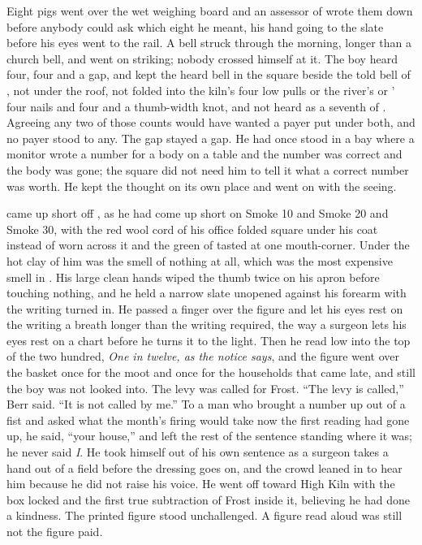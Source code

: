 Eight pigs went over the wet weighing board and an assessor of  wrote them down before anybody could ask which eight he meant, his hand going to the slate before his eyes went to the rail. A bell struck through the morning, longer than a church bell, and went on striking; nobody crossed himself at it. The boy heard four, four and a gap, and kept the heard bell in the square beside the told bell of , not under the roof, not folded into the kiln's four low pulls or the river's  or ' four nails and four and a thumb-width knot, and not heard as a seventh of . Agreeing any two of those counts would have wanted a payer put under both, and no payer stood to any. The gap stayed a gap. He had once stood in a bay where a monitor wrote a number for a body on a table and the number was correct and the body was gone; the square did not need him to tell it what a correct number was worth. He kept the thought on its own place and went on with the seeing.

 came up short off , as he had come up short on Smoke 10 and Smoke 20 and Smoke 30, with the red wool cord of his office folded square under his coat instead of worn across it and the green of tasted  at one mouth-corner. Under the hot clay of him was the smell of nothing at all, which was the most expensive smell in . His large clean hands wiped the thumb twice on his apron before touching nothing, and he held a narrow slate unopened against his forearm with the writing turned in. He passed a finger over the figure and let his eyes rest on the writing a breath longer than the writing required, the way a surgeon lets his eyes rest on a chart before he turns it to the light. Then he read low into the top of the two hundred, \emph{One in twelve, as the notice says}, and the figure went over the basket once for the moot and once for the households that came late, and still the boy was not looked into. The levy was called for Frost. “The levy is called,” Berr said. “It is not called by me.” To a man who brought a number up out of a fist and asked what the month's firing would take now the first reading had gone up, he said, “your house,” and left the rest of the sentence standing where it was; he never said \emph{I}. He took himself out of his own sentence as a surgeon takes a hand out of a field before the dressing goes on, and the crowd leaned in to hear him because he did not raise his voice. He went off toward High Kiln with the box locked and the first true subtraction of Frost inside it, believing he had done a kindness. The printed figure stood unchallenged. A figure read aloud was still not the figure paid.

